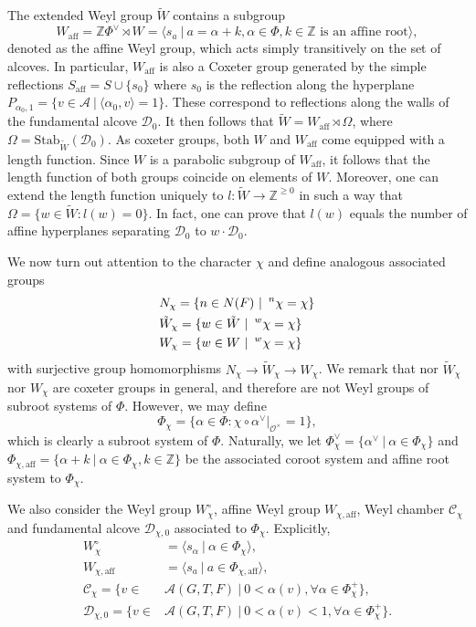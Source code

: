 \documentclass{article}
\newcommand{\aff}{\mathrm{aff}}
\newcommand{\valpha}{\alpha^\vee}
\newcommand{\vPhi}{\Phi^\vee}
\newcommand{\cO}{\mathcal{O}}
\newcommand{\ZZ}{\mathbb{Z}}
\theoremstyle{plain}
\theoremstyle{definition}
\begin{document}
    The extended Weyl group $\tilde{W}$ contains a subgroup $$W_{\aff}=\ZZ\vPhi\rtimes W=\langle s_a\ |\ a=\alpha+k,\alpha\in\Phi,k\in\ZZ \text{ is an affine root}\rangle,$$ denoted as the affine Weyl group, which acts simply transitively on the set of alcoves. In particular, $W_{\aff}$ is also a Coxeter group generated by the simple reflections $S_{\aff}=S\cup\{s_0\}$ where $s_0$ is the reflection along the hyperplane $P_{\alpha_0,1}=\{v\in\mathcal{A}\ |\ \langle\alpha_0,v\rangle=1\}$. These correspond to reflections along the walls of the fundamental alcove $\mathcal{D}_0$. It then follows that $\tilde{W}=W_{\aff}\rtimes\Omega$, where $\Omega=\mathrm{Stab}_{\tilde{W}}(\mathcal{D}_0)$. As coxeter groups, both $W$ and $W_{\aff}$ come equipped with a length function. Since $W$ is a parabolic subgroup of $W_{\aff}$, it follows that the length function of both groups coincide on elements of $W$. Moreover, one can extend the length function uniquely to $l:\tilde{W}\rightarrow\ZZ^{\geq0}$ in such a way that $\Omega=\{w\in\tilde{W}:l(w)=0\}$. In fact, one can prove that $l(w)$ equals the number of affine hyperplanes separating $\mathcal{D}_0$ to $w\cdot\mathcal{D}_0$.

    We now turn out attention to the character $\chi$ and define analogous associated groups
    \begin{align*}
        &N_{\chi}=\{n\in N(F)\ |\ \prescript{n}{}{\chi}=\chi\}\\
        &\tilde{W}_{\chi}=\{w\in \tilde{W}\ |\ \prescript{w}{}{\chi}=\chi\}\\
        &W_{\chi}=\{w\in W\ |\ \prescript{w}{}{\chi}=\chi\}
    \end{align*}
    with surjective group homomorphisms $N_\chi\rightarrow\tilde{W}_\chi\rightarrow W_\chi$. We remark that nor $\tilde{W}_\chi$ nor $W_\chi$ are coxeter groups in general, and therefore are not Weyl groups of subroot systems of $\Phi$. However, we may define $$\Phi_\chi=\{\alpha\in\Phi:\chi\circ\alpha^\vee|_{\cO^\times}=1\},$$ which is clearly a subroot system of $\Phi$. Naturally, we let $\vPhi_\chi=\{\valpha\ |\ \alpha\in\Phi_\chi\}$ and $\Phi_{\chi,\aff}=\{\alpha+k\ |\ \alpha\in\Phi_\chi,k\in\ZZ\}$ be the associated coroot system and affine root system to $\Phi_\chi$. 
    
    We also consider the Weyl group $W_\chi^\circ$, affine Weyl group $W_{\chi,\aff}$, Weyl chamber $\mathcal{C}_\chi$ and fundamental alcove $\mathcal{D}_{\chi,0}$ associated to $\Phi_\chi$. Explicitly,
    \begin{align*}
        W_\chi^\circ&=\langle s_\alpha\ |\ \alpha\in\Phi_\chi\rangle,\\
        W_{\chi,\textrm{aff}}&=\langle s_a \ |\  a\in\Phi_{\chi,\aff}\rangle,\\
        \mathcal{C}_\chi=\{v\in&\mathcal{A}(G,T,F)\ |\ 0<\alpha(v), \forall\alpha\in\Phi_\chi^+\},\\
        \mathcal{D}_{\chi,0}=\{v\in&\mathcal{A}(G,T,F)\ |\ 0<\alpha(v)<1, \forall\alpha\in\Phi_\chi^+\}.
    \end{align*}
\end{document}
